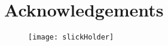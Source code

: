 %
\chapter*{Acknowledgements}
\label{sec:acknowledgement}
\vspace*{-10mm}

\begin{figure}[H]%
	\centering%
	\texttt{[image: slickHolder]}%
\end{figure}%

